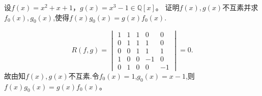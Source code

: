 \documentclass[../../main.tex]{subfiles}%
\begin{document}
\begin{example}
设$f(x)=x^2+x+1$，$g(x)=x^3-1\in\mathbb{Q}[x]$。
证明$f(x),g(x)$不互素并求$f_0(x),g_0(x)$,使得$f(x)g_0(x)=g(x)f_0(x)$.
\end{example}
\begin{solution}
$$R(f,g)=\begin{vmatrix}
1 & 1 & 1 & 0 & 0 \\
0 & 1 & 1 & 1 & 0 \\
0 & 0 & 1 & 1 & 1 \\
1 & 0 & 0 & -1 & 0 \\
0 & 1 & 0 & 0 & -1
\end{vmatrix}=0.$$
故由知$f(x),g(x)$不互素.令$f_0(x)=1$,$g_0(x)=x-1$,则$f(x)g_0(x)=g(x)f_0(x)$。

\end{solution}
\end{document}
